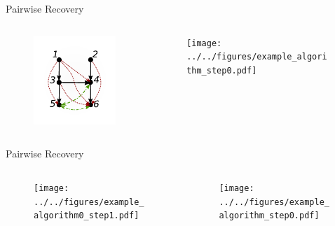 \documentclass{beamer} %
\begin{document}
\begin{frame}{Pairwise Recovery}
  \begin{columns}
    \begin{column}{0.5\linewidth}
      \begin{figure}
        \includegraphics[width=\linewidth]{../../figures/example_algorithm.pdf}
      \end{figure}
    \end{column}

    \begin{column}{0.5\linewidth}
      \begin{figure}
        \texttt{[image: ../../figures/example\_algorithm\_step0.pdf]}
      \end{figure}
    \end{column}
  \end{columns}
\end{frame}

\begin{frame}{Pairwise Recovery}
  \begin{columns}
    \begin{column}{0.5\linewidth}
      \begin{figure}
        \texttt{[image: ../../figures/example\_algorithm0\_step1.pdf]}
      \end{figure}
    \end{column}

    \begin{column}{0.5\linewidth}
      \begin{figure}
        \texttt{[image: ../../figures/example\_algorithm\_step0.pdf]}
      \end{figure}
    \end{column}
  \end{columns}
\end{frame}
\end{document}
